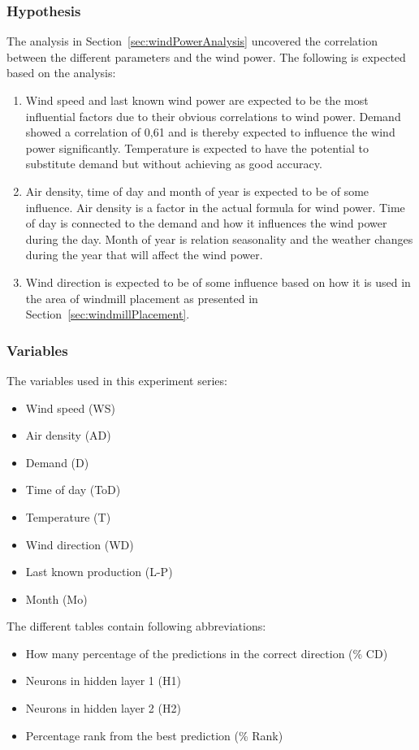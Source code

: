 \subsubsection{Hypothesis}
The analysis in Section~\ref{sec:windPowerAnalysis} uncovered the correlation between the different parameters and the wind power. The following is expected based on the analysis:

\begin{enumerate}
\item Wind speed and last known wind power are expected to be the most influential factors due to their obvious correlations to wind power. Demand showed a correlation of 0,61 and is thereby expected to influence the wind power significantly. Temperature is expected to have the potential to substitute demand but without achieving as good accuracy. 
\item Air density, time of day and month of year is expected to be of some influence. Air density is a factor in the actual formula for wind power. Time of day is connected to the demand and how it influences the wind power during the day. Month of year is relation seasonality and the weather changes during the year that will affect the wind power. 
\item Wind direction is expected to be of some influence based on how it is used in the area of windmill placement as presented in Section~\ref{sec:windmillPlacement}.
\end{enumerate}

\subsubsection{Variables}
The variables used in this experiment series:

\begin{itemize}
\item Wind speed (WS)
\item Air density (AD)
\item Demand (D)
\item Time of day (ToD)
\item Temperature (T)
\item Wind direction (WD)
\item Last known production (L-P)
\item Month (Mo)
\end{itemize}

The different tables contain following abbreviations:

\begin{itemize}
\item How many percentage of the predictions in the correct direction (\% CD)
\item Neurons in hidden layer 1 (H1)
\item Neurons in hidden layer 2 (H2)
\item Percentage rank from the best prediction (\% Rank)
\end{itemize}

